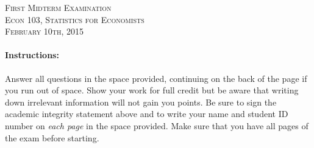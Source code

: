 \documentclass[addpoints,12pt]{exam}
\begin{document}
\begin{center}
\textsc{\large First Midterm Examination\\ \normalsize Econ 103, Statistics for Economists \\ \vspace{0.5em} February 10th, 2015}

\vspace{2em}



\end{center}


\vspace{2em}
\begin{center}
\end{center}
\vspace{0.2in}

\vspace{0.2in}

\noindent{}

\vspace{0.2in}

\noindent{}
\hfill
{}

\vspace{2em}

\begin{center}
  \gradetable[h][questions]
\end{center}

\vspace{2em}

\paragraph{Instructions:} Answer all questions in the space provided, continuing on the back of the page if you run out of space. Show your work for full credit but be aware that writing down irrelevant information will not gain you points. Be sure to sign the academic integrity statement above and to write your name and student ID number on \emph{each page} in the space provided. Make sure that you have all pages of the exam before starting.
\end{document}
